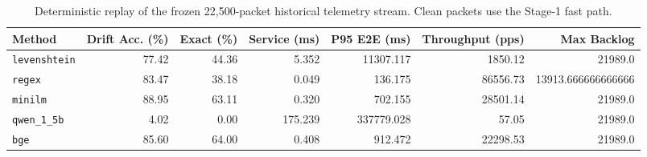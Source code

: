 \begin{table}[t]
\centering
\small
\begin{tabular}{lrrrrrr}
\toprule
Method & Drift Acc. (\%) & Exact (\%) & Service (ms) & P95 E2E (ms) & Throughput (pps) & Max Backlog \\
\midrule
\texttt{levenshtein} & 77.42 & 44.36 & 5.352 & 11307.117 & 1850.12 & 21989.0 \\
\texttt{regex} & 83.47 & 38.18 & 0.049 & 136.175 & 86556.73 & 13913.666666666666 \\
\texttt{minilm} & 88.95 & 63.11 & 0.320 & 702.155 & 28501.14 & 21989.0 \\
\texttt{qwen\_1\_5b} & 4.02 & 0.00 & 175.239 & 337779.028 & 57.05 & 21989.0 \\
\texttt{bge} & 85.60 & 64.00 & 0.408 & 912.472 & 22298.53 & 21989.0 \\
\bottomrule
\end{tabular}
\caption{Deterministic replay of the frozen 22,500-packet historical telemetry stream. Clean packets use the Stage-1 fast path.}
\label{tab:frozen-stream-replay}
\end{table}
